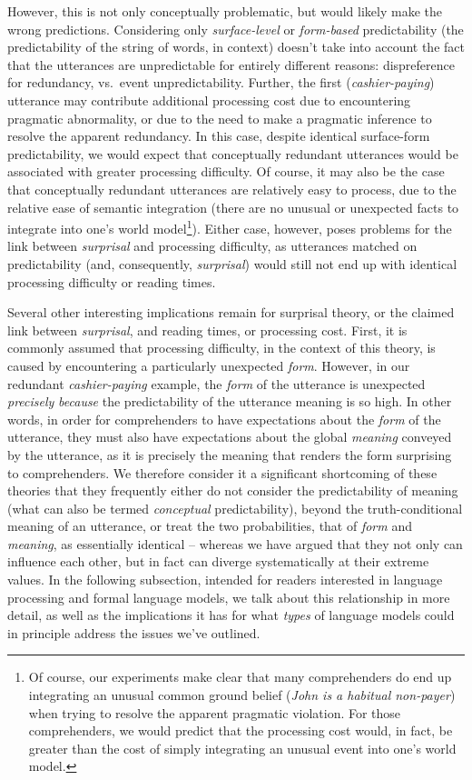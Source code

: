 However, this is not only conceptually problematic, but would likely
make the wrong predictions. Considering only \emph{surface-level} or
\emph{form-based} predictability (the predictability of the string of
words, in context) doesn't take into account the fact that the
utterances are unpredictable for entirely different reasons:
dispreference for redundancy, vs.~event unpredictability. Further, the
first (\emph{cashier-paying}) utterance may contribute additional
processing cost due to encountering pragmatic abnormality, or due to the
need to make a pragmatic inference to resolve the apparent redundancy.
In this case, despite identical surface-form predictability, we would
expect that conceptually redundant utterances would be associated with
greater processing difficulty. Of course, it may also be the case that
conceptually redundant utterances are relatively easy to process, due to
the relative ease of semantic integration (there are no unusual or
unexpected facts to integrate into one's world model\footnote{Of course,
  our experiments make clear that many comprehenders do end up
  integrating an unusual common ground belief (\emph{John is a habitual
  non-payer}) when trying to resolve the apparent pragmatic violation.
  For those comprehenders, we would predict that the processing cost
  would, in fact, be greater than the cost of simply integrating an
  unusual event into one's world model.}). Either case, however, poses
problems for the link between \emph{surprisal} and processing
difficulty, as utterances matched on predictability (and, consequently,
\emph{surprisal}) would still not end up with identical processing
difficulty or reading times.

Several other interesting implications remain for surprisal theory, or
the claimed link between \emph{surprisal}, and reading times, or
processing cost. First, it is commonly assumed that processing
difficulty, in the context of this theory, is caused by encountering a
particularly unexpected \emph{form}. However, in our redundant
\emph{cashier-paying} example, the \emph{form} of the utterance is
unexpected \emph{precisely} \emph{because} the predictability of the
utterance meaning is so high. In other words, in order for comprehenders
to have expectations about the \emph{form} of the utterance, they must
also have expectations about the global \emph{meaning} conveyed by the
utterance, as it is precisely the meaning that renders the form
surprising to comprehenders. We therefore consider it a significant
shortcoming of these theories that they frequently either do not
consider the predictability of meaning (what can also be termed
\emph{conceptual} predictability), beyond the truth-conditional meaning
of an utterance, or treat the two probabilities, that of \emph{form} and
\emph{meaning}, as essentially identical -- whereas we have argued that
they not only can influence each other, but in fact can diverge
systematically at their extreme values. In the following subsection,
intended for readers interested in language processing and formal
language models, we talk about this relationship in more detail, as well
as the implications it has for what \emph{types} of language models
could in principle address the issues we've outlined.

